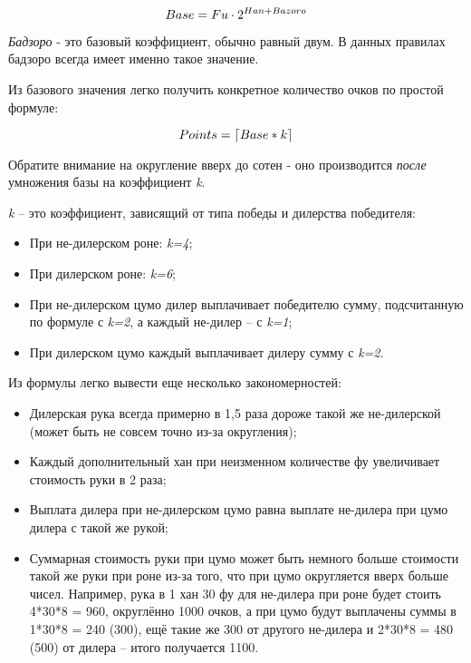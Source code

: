 \begin{equation}
	\large
	Base = Fu \cdot 2 ^ {Han + Bazoro}
\end{equation}

\textit{Бадзоро} - это базовый коэффициент, обычно равный двум. В данных правилах бадзоро всегда имеет именно такое значение.

Из базового значения легко получить конкретное количество очков по простой формуле:

\begin{equation}
	\large
	Points = \lceil Base * k \rceil
\end{equation}

Обратите внимание на округление вверх до сотен - оно производится \textit{после} умножения базы на коэффициент \textit{k}. 

\textit{k} – это коэффициент, зависящий от типа победы и дилерства победителя:
\begin{itemize}
	\item При не-дилерском роне: \textit{k=4};
	\item При дилерском роне: \textit{k=6};
	\item При не-дилерском цумо дилер выплачивает победителю сумму, подсчитанную по формуле с \textit{k=2}, а каждый не-дилер – с \textit{k=1};
	\item При дилерском цумо каждый выплачивает дилеру сумму с \textit{k=2}.
\end{itemize}

Из формулы легко вывести еще несколько закономерностей:
\begin{itemize}
	\item Дилерская рука всегда примерно в 1,5 раза дороже такой же не-дилерской (может быть не совсем точно из-за округления);
	\item Каждый дополнительный хан при неизменном количестве фу увеличивает стоимость руки в 2 раза;
	\item Выплата дилера при не-дилерском цумо равна выплате не-дилера при цумо дилера с такой же рукой;
	\item Суммарная стоимость руки при цумо может быть немного больше стоимости такой же руки при роне из-за того, что при цумо округляется вверх больше чисел. Например, рука в 1 хан 30 фу для не-дилера при роне будет стоить 4*30*8 = 960, округлённо 1000 очков, а при цумо будут выплачены суммы в 1*30*8 = 240 (300), ещё такие же 300 от другого не-дилера и 2*30*8 = 480
	(500) от дилера – итого получается 1100.	
\end{itemize}

